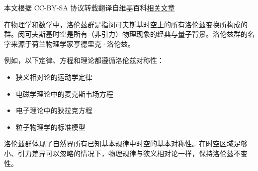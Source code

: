 
本文根据 CC-BY-SA 协议转载翻译自维基百科\href{https://en.wikipedia.org/wiki/Lorentz_group}{相关文章}

在物理学和数学中，洛伦兹群是指闵可夫斯基时空上的所有洛伦兹变换所构成的群。闵可夫斯基时空是所有（非引力）物理现象的经典与量子背景。洛伦兹群的名字来源于荷兰物理学家亨德里克·洛伦兹。

例如，以下定律、方程和理论都遵循洛伦兹对称性：
\begin{itemize}
\item 狭义相对论的运动学定律
\item 电磁学理论中的麦克斯韦场方程
\item 电子理论中的狄拉克方程
\item 粒子物理学的标准模型
\end{itemize}
洛伦兹群体现了自然界所有已知基本规律中时空的基本对称性。在时空区域足够小、引力差异可以忽略的情况下，物理规律与狭义相对论一样，保持洛伦兹不变性。
